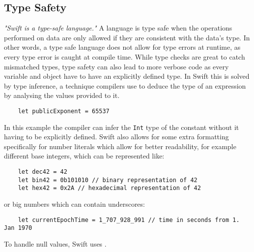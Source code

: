 \subsection{Type Safety}
\textit{"Swift is a type-safe language."}\cite{swift-book} A language is type safe when the operations performed on data are only allowed if they are consistent with the data's type. In other words, a type safe language does not allow for type errors at runtime, as every type error is caught at compile time. While type checks are great to catch mismatched types, type safety can also lead to more verbose code as every variable and object have to have an explicitly defined type. In Swift this is solved by type inference, a technique compilers use to deduce the type of an expression by analysing the values provided to it.
\begin{verbatim}
    let publicExponent = 65537
\end{verbatim}
In this example the compiler can infer the \lstinline{Int} type of the constant without it having to be explicitly defined.
Swift also allows for some extra formatting specifically for number literals which allow for better readability, for example different base integers, which can be represented like:
\begin{verbatim}
    let dec42 = 42
    let bin42 = 0b101010 // binary representation of 42
    let hex42 = 0x2A // hexadecimal representation of 42
\end{verbatim}
or big numbers which can contain underscores:
\begin{verbatim}
    let currentEpochTime = 1_707_928_991 // time in seconds from 1. Jan 1970
\end{verbatim}
\cite{swift-book}
To handle null values, Swift uses .

